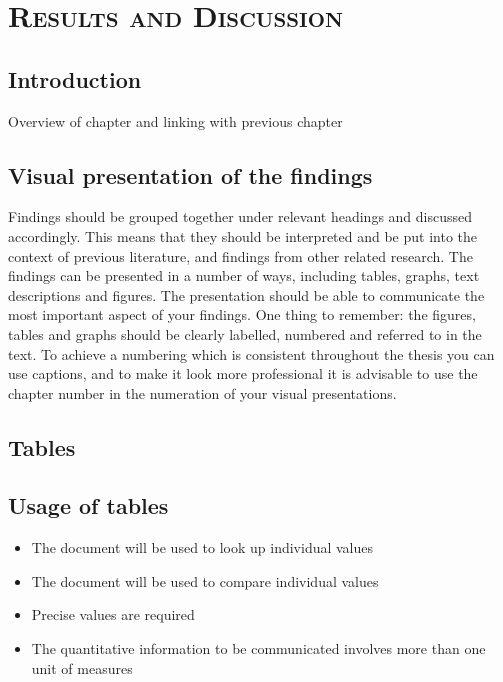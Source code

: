 %
%
% 
% 
% 


\chapter{\textsc{Results and Discussion}}
\label{chap:results}

\section{Introduction}
\label{sec:introcap4}

Overview of chapter and linking with previous chapter

\section{Visual presentation of the findings}
\label{sec:visualrep}

Findings should be grouped together under relevant headings and discussed accordingly. This means that they should be interpreted and be 
put into the context of previous literature, and findings from other related research. The findings can be presented in a number of ways, 
including tables, graphs, text descriptions and figures. The presentation should be able to communicate the most important aspect of your findings. 
One thing to remember: the figures, tables and graphs should be clearly labelled, numbered and referred to in the text. To achieve a numbering which 
is consistent throughout the thesis you can use captions, and to make it look more professional it is advisable to use the chapter number in the numeration of your visual presentations. 

\section{Tables}
\label{sec:tables}

\section{Usage of tables}
\label{sec:usagetables}

\begin{itemize}
\item The document will be used to look up individual values
\item The document will be used to compare individual values
\item Precise values are required
\item The quantitative information to be communicated involves more than one unit of measures 
\end{itemize}

